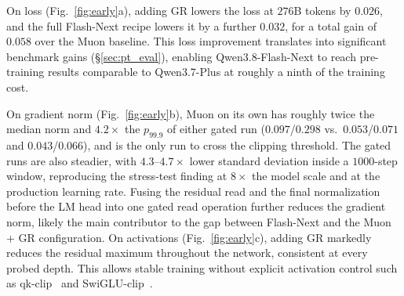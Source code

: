 On loss (Fig.~\ref{fig:early}a), adding GR lowers the loss at $276$B tokens
by $0.026$, and the full Flash-Next recipe lowers it by a further
$0.032$, for a total gain of $0.058$ over the Muon baseline. This loss
improvement translates into significant benchmark gains
(\S\ref{sec:pt_eval}), enabling Qwen3.8-Flash-Next to reach pre-training
results comparable to Qwen3.7-Plus at roughly a ninth of the training
cost.

On gradient norm (Fig.~\ref{fig:early}b), Muon on its own has roughly twice the median norm and $4.2\times$ the $p_{99.9}$ of either gated run ($0.097$/$0.298$ vs.\ $0.053$/$0.071$ and $0.043$/$0.066$), and is the only
run to cross the clipping threshold. 
The gated runs are also steadier, with $4.3$--$4.7\times$ lower standard deviation inside a $1000$-step window, reproducing the stress-test finding at $8\times$ the model scale and at the production learning rate. 
Fusing the residual read and the final normalization before the LM head into one gated read operation further
reduces the gradient norm, likely the main contributor to the gap between Flash-Next and the Muon + GR configuration.
On activations (Fig.~\ref{fig:early}c), adding GR markedly reduces the
residual maximum throughout the network, consistent at every probed depth.
This allows stable training without explicit activation control such as qk-clip~\citep{kimi2025k2} and SwiGLU-clip~\citep{agarwal2025gpt}.
